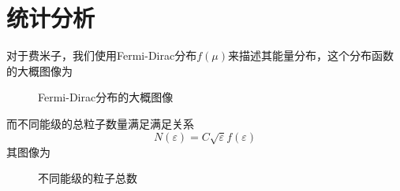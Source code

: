 \section{统计分析} %
\label{sec:统计分析}
对于费米子，我们使用Fermi-Dirac分布$f(\mu)$来描述其能量分布，这个分布函数的大概图像为
\begin{figure}[h]
       \centering
       \qquad
       \caption{Fermi-Dirac分布的大概图像}
       \label{fig:fermi distribution}
\end{figure}
而不同能级的总粒子数量满足满足关系\begin{equation}
    N(\varepsilon) = C \sqrt{\varepsilon} f(\varepsilon) 
\end{equation}
其图像为
\begin{figure}[h]
    \centering
    \qquad
    \caption{不同能级的粒子总数}
    \label{fig:fermi distribution times sqrte}
\end{figure}

